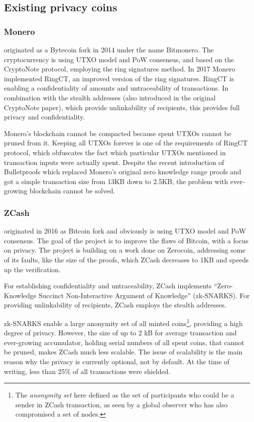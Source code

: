 \documentclass[a4paper, 10pt, conference]{ieeeconf}
\begin{document}
\subsection{Existing privacy coins}

\subsubsection{Monero} originated as a Bytecoin fork in 2014 under the name Bitmonero. The cryptocurrency is using UTXO model and PoW consensus, and based on the CryptoNote protocol\cite{c2}, employing the ring signatures method. In 2017 Monero implemented RingCT\cite{c3}, an improved version of the ring signatures. RingCT is enabling a confidentiality of amounts and untraceability of transactions. In combination with the stealth addresses (also introduced in the original CryptoNote paper), which provide unlinkability of recipients, this provides full privacy and confidentiality.

Monero's blockchain cannot be compacted because spent UTXOs cannot be pruned from it. Keeping all UTXOs forever is one of the requirements of RingCT protocol, which obfuscates the fact which particular UTXOs mentioned in transaction inputs were actually spent. 
Despite the recent introduction of Bulletproofs\cite{c4} which replaced Monero's original zero knowledge range proofs and got a simple transaction size from 13KB down to 2.5KB, the problem with ever-growing blockchain cannot be solved. 

\subsubsection{ZCash} originated in 2016 as Bitcoin fork and obviously is using UTXO model and PoW consensus. The goal of the project is to improve the flaws of Bitcoin, with a focus on privacy. The project is building on a work done on Zerocoin\cite{c5}, addressing some of its faults, like the size of the proofs, which ZCash decreases to 1KB and speeds up the verification.

For establishing confidentiality and untraceability, ZCash implements ``Zero-Knowledge Succinct Non-Interactive Argument of Knowledge'' (zk-SNARKS)\cite{c6}. For providing unlinkability of recipients, ZCash employs the stealth addresses.

zk-SNARKS enable a large anonymity set of all minted coins\footnote{The \textit{anonymity set} here defined as the set of participants who could be a sender in ZCash transaction, as seen by a global observer who has also compromised a set of nodes.}, providing a high degree of privacy. However, the size of up to 2 kB for average transaction and ever-growing accumulator, holding serial numbers of all spent coins, that cannot be pruned, makes ZCash much less scalable. The issue of scalability is the main reason why the privacy is currently optional, not by default. At the time of writing, less than 25\% of all transactions were shielded.
\end{document}
